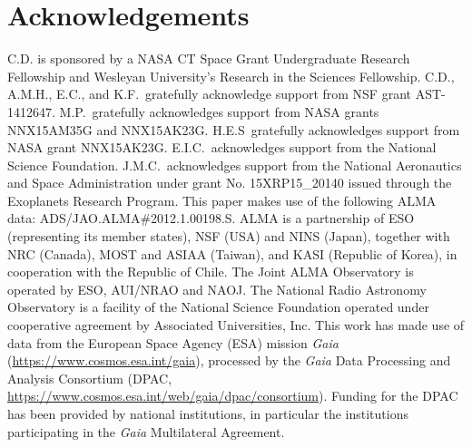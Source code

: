 \documentclass[modern]{aastex62}
\begin{document}
\section*{Acknowledgements}
C.D. is sponsored by a NASA CT Space Grant Undergraduate Research Fellowship and Wesleyan University's Research in the Sciences Fellowship.  
C.D., A.M.H., E.C., and K.F.~gratefully acknowledge support from NSF grant AST-1412647.  
M.P.~gratefully acknowledges support from NASA grants NNX15AM35G and NNX15AK23G.
H.E.S~gratefully acknowledges support from NASA grant NNX15AK23G.
E.I.C.~acknowledges support from the National Science Foundation.
J.M.C.~acknowledges support from the National Aeronautics and Space Administration under grant No. 15XRP15\_20140 issued through the Exoplanets Research Program.
This paper makes use of the following ALMA data:  ADS/JAO.ALMA\#2012.1.00198.S.  
ALMA is a partnership of ESO (representing its member states), NSF (USA) and NINS (Japan), together with NRC (Canada), MOST and ASIAA (Taiwan), and KASI (Republic of Korea), in cooperation with the Republic of Chile.  
The Joint ALMA Observatory is operated by ESO, AUI/NRAO and NAOJ.  
The National Radio Astronomy Observatory is a facility of the National Science Foundation operated under cooperative agreement by Associated Universities, Inc.
This work has made use of data from the European Space Agency (ESA) mission {\it Gaia} (\url{https://www.cosmos.esa.int/gaia}), processed by the {\it Gaia}
Data Processing and Analysis Consortium (DPAC, \url{https://www.cosmos.esa.int/web/gaia/dpac/consortium}). 
Funding for the DPAC has been provided by national institutions, in particular the institutions participating in the {\it Gaia} Multilateral Agreement.

\clearpage

% 
\end{document}
